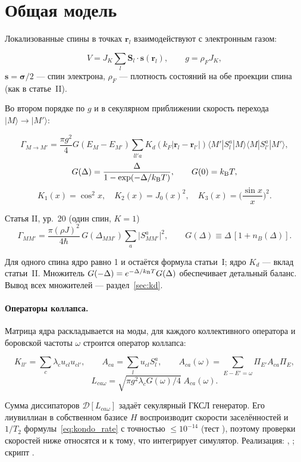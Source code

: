 \section{Общая модель}
Локализованные спины в точках $\mathbf r_l$ взаимодействуют с электронным
газом:
\begin{keybox}
\[
 V=J_K\sum_l\mathbf S_l\cdot\mathbf s(\mathbf r_l),\qquad
 g=\rho_FJ_K,
\]
$\mathbf s=\boldsymbol\sigma/2$ --- спин электрона, $\rho_F$ --- плотность состояний на обе проекции
спина (как в статье~II).
\end{keybox}
Во втором порядке по $g$ и в секулярном приближении скорость перехода
$|M\rangle\to|M'\rangle$:
\begin{resbox}
\begin{equation}
 \Gamma_{M\to M'}=\frac{\pi g^2}{4}G(E_M-E_{M'})
 \sum_{ll'a}K_d(k_F|\mathbf r_l-\mathbf r_{l'}|)
 \langle M'|S_l^a|M\rangle\langle M|S_{l'}^a|M'\rangle,
 \label{eq:kondo_rate}
\end{equation}
\[
 G(\Delta)=\frac{\Delta}{1-\exp(-\Delta/k_{\mathrm B}T)},\qquad G(0)=k_{\mathrm B}T,
\]
\[
 K_1(x)=\cos^2x,\quad K_2(x)=J_0(x)^2,\quad K_3(x)=\Big(\frac{\sin x}{x}\Big)^2 .
\]
\end{resbox}
\begin{paperbox}{Статья II, ур.~20 (один спин, $K=1$)}
\[
\Gamma_{MM'}=\frac{\pi(\rho J)^2}{4\hbar}\,G(\Delta_{MM'})\sum_a\big|S^a_{MM'}\big|^2,\qquad
G(\Delta)\equiv\Delta\,[1+n_B(\Delta)].
\]
\end{paperbox}
Для одного спина ядро равно 1 и остаётся формула статьи~I; ядро $K_d$ ---
вклад статьи~II. Множитель $G(-\Delta)=e^{-\Delta/k_{\mathrm B}T}G(\Delta)$ обеспечивает
детальный баланс. Вывод всех множителей --- раздел~\ref{sec:kd}.

\paragraph{Операторы коллапса.} Матрица ядра раскладывается на моды, для
каждого коллективного оператора и боровской частоты $\omega$ строится оператор
коллапса:
\begin{keybox}
\[
K_{ll'}=\sum_c\lambda_cu_{cl}u_{cl'},\qquad A_{ca}=\sum_lu_{cl}S_l^a,\qquad
A_{ca}(\omega)=\sum_{E-E'=\omega}\Pi_{E'}A_{ca}\Pi_E,
\]
\[
L_{ca\omega}=\sqrt{\pi g^2\lambda_cG(\omega)/4}\;A_{ca}(\omega).
\]
\end{keybox}
Сумма диссипаторов $\mathcal D[L_{ca\omega}]$ задаёт секулярный ГКСЛ
генератор. Его лиувиллиан в собственном базисе $H$ воспроизводит скорости
заселённостей и $1/T_2$ формулы~\eqref{eq:kondo_rate} с точностью $\le10^{-14}$
(тест ), поэтому
проверки скоростей ниже относятся и к тому, что интегрирует симулятор.
Реализация: , ;
скрипт .

